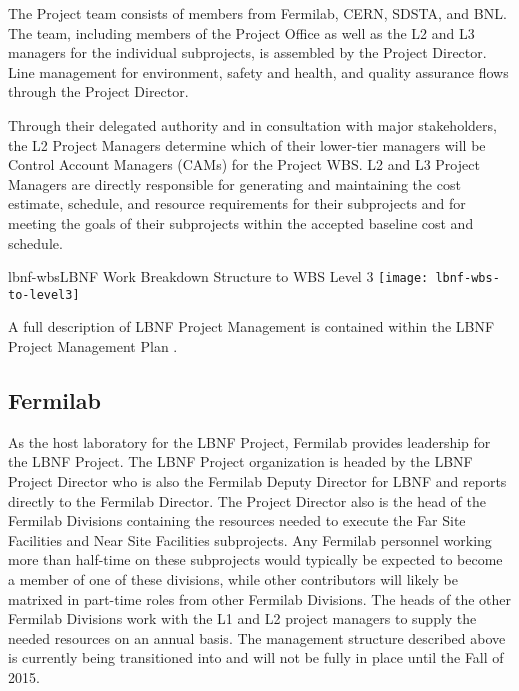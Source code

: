 The Project team consists of members from Fermilab, CERN, SDSTA, and BNL.  The team, including members of the Project Office as well as the L2 and L3 managers for the individual subprojects, is assembled by the Project Director.
Line management for environment, safety and health, and quality assurance flows through the Project Director.
 
Through their delegated authority and in consultation with major stakeholders, the L2 Project Managers determine which of their lower-tier managers will be Control Account Managers (CAMs) for the Project WBS. L2 and L3 Project Managers are directly responsible for generating and maintaining the cost estimate, schedule, and resource requirements for their subprojects and for meeting the goals of their subprojects within the accepted baseline cost and schedule.
 
\begin{cdrfigure}{lbnf-wbs}{LBNF Work Breakdown Structure to WBS Level 3}
\texttt{[image: lbnf-wbs-to-level3]}
\end{cdrfigure}
 
A full description of LBNF Project Management is contained within the LBNF Project Management Plan \fixme{[ref]}.
 
\subsection{Fermilab} %
 
As the host laboratory for the LBNF Project, Fermilab provides leadership for the LBNF Project. The LBNF Project organization is headed by the LBNF Project Director who is also the Fermilab Deputy Director for LBNF and reports directly to the Fermilab Director. The Project Director also is the head of the Fermilab Divisions containing the resources needed to execute the Far Site Facilities and Near Site Facilities subprojects. Any Fermilab personnel working more than half-time on these subprojects would typically be expected to become a member of one of these divisions, while other contributors will likely be matrixed in part-time roles from other Fermilab Divisions. The heads of the other Fermilab Divisions work with the L1 and L2 project managers to supply the needed resources on an annual basis. The management structure described above is currently being transitioned into and will not be fully in place until the Fall of 2015.
 
